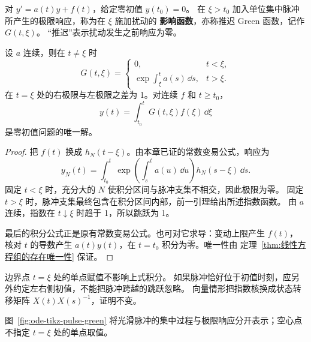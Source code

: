 \begin{definition}[推迟影响函数]
对 $y'=a(t)y+f(t)$，给定零初值 $y(t_0)=0$。
在 $\xi>t_0$ 加入单位集中脉冲所产生的极限响应，称为在 $\xi$ 施加扰动的
\textbf{影响函数}，亦称推迟 Green 函数，记作 $G(t,\xi)$。
“推迟”表示扰动发生之前响应为零。
\end{definition}
\begin{theorem}
设 $a$ 连续，则在 $t\ne\xi$ 时
\[
 G(t,\xi)=
 \begin{cases}
 0,&t<\xi,\\
 \exp\displaystyle\int_\xi^t a(s)\,\dd s,&t>\xi.
 \end{cases}
\]
在 $t=\xi$ 处的右极限与左极限之差为 1。对连续 $f$ 和 $t\geq t_0$，
\[
 y(t)=\int_{t_0}^tG(t,\xi)f(\xi)\,\dd\xi
\]
是零初值问题的唯一解。
\end{theorem}
\begin{proof}
把 $f(t)$ 换成 $h_N(t-\xi)$。由本章已证的常数变易公式，响应为
\[
 y_N(t)=\int_{t_0}^t
 \exp\left(\int_s^t a(u)\,\dd u\right)h_N(s-\xi)\,\dd s.
\]
固定 $t<\xi$ 时，充分大的 $N$ 使积分区间与脉冲支集不相交，因此极限为零。
固定 $t>\xi$ 时，脉冲支集最终包含在积分区间内部，前一引理给出所述指数函数。
由 $a$ 连续，指数在 $t\downarrow\xi$ 时趋于 1，所以跳跃为 1。

最后的积分公式正是原有常数变易公式。也可对它求导：变动上限产生 $f(t)$，
核对 $t$ 的导数产生 $a(t)y(t)$，在 $t=t_0$ 积分为零。唯一性由
定理~\ref{thm:线性方程组的存在唯一性} 保证。
\end{proof}
\begin{remark}
边界点 $t=\xi$ 处的单点赋值不影响上式积分。
如果脉冲恰好位于初值时刻，应另外约定左右侧初值，不能把脉冲跨越的跳跃忽略。
向量情形把指数核换成状态转移矩阵 $X(t)X(s)^{-1}$，证明不变。
\end{remark}

图~\ref{fig:ode-tikz-pulse-green} 将光滑脉冲的集中过程与极限响应分开表示；空心点不指定 $t=\xi$ 处的单点取值。
\begin{center}
\begin{minipage}{0.96\linewidth}
\centering

\label{fig:ode-tikz-pulse-green}
\end{minipage}
\end{center}

